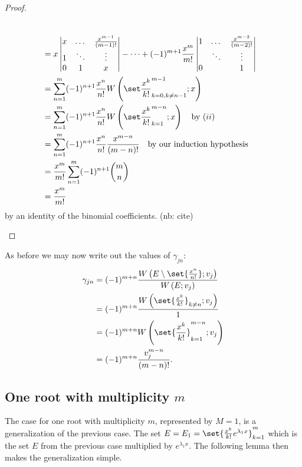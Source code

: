 \documentclass{article}
\begin{document}
\begin{proof}
\begin{description}
\begin{align*}
\\
& = x \begin{vmatrix} x & \dots & \poly{m-1} \\ 1 & \ddots & \vdots \\ 0 & 1 & x \end{vmatrix} - \dots + (-1)^{m+1} \Poly{m} \begin{vmatrix} 1 & \dots & \poly{m-2} \\  & \ddots & \vdots \\ 0 &  & 1 \end{vmatrix} \\
& = \sum_{n=1}^m (-1)^{n+1} \Poly{n} \Wpoly{k=0,k \neq n-1}{m-1} \\
& = \sum_{n=1}^m (-1)^{n+1} \Poly{n} \Wpoly{k=1}{m-n} \quad \text{by $(ii)$} \\
& = \sum_{n=1}^m (-1)^{n+1} \Poly{n} \poly{m-n} \quad \text{by our induction hypothesis} \\
& = \Poly{m} \sum_{n=1}^m (-1)^{n+1} \binom{m}{n} \\
& = \Poly{m}
\end{align*}
by an identity of the binomial coefficients. (nb: cite)
\end{description}
\end{proof}

As before we may now write out the values of $\gamma_{jn}$:
\begin{equation*}
\begin{split}
\gamma_{jn} & = (-1)^{m+n} \frac{ \W{E \setminus \set{\Poly{n}}}{v_j}}{\W{E}{v_j}} \\
			& = (-1)^{m+n} \frac{\W{\set{\Poly{k}}_{k \neq n}}{v_j}}{1} \\
			& = (-1)^{m+n} \W{\set{\Poly{k}}_{k=1}^{m-n}}{v_j} \\
			& = (-1)^{m+n} \frac{v_j^{m-n}}{(m-n)!} .
\end{split}
\end{equation*}

\subsection{One root with multiplicity $m$}

The case for one root with multiplicity $m$, represented by $M=1$, is a generalization of the previous case.
The set $E = E_1 = \set{\Poly{k} e^{\lambda_1 x}}_{k=1}^m$ which is the set $E$ from the previous case multiplied by $e^{\lambda_1 x}$.
The following lemma then makes the generalization simple.
\end{document}
